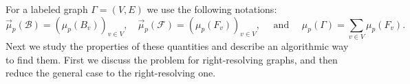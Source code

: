 \documentclass[12pt]{article}
\newcommand{\xmo}{X^{-\omega}}
\newcommand{\xo}{X^\omega}
\newcommand{\gr}{\Gamma}
\newcommand{\B}{\mathscr{B}}
\newcommand{\F}{\mathscr{F}}
\theoremstyle{definition}
\begin{document}
%
%

For a labeled graph $\gr=(V,E)$ we use the following notations:
\[
\vec\mu_p(\B)=(\mu_p(B_v))_{v\in V}, \quad  \vec\mu_p(\F)=(\mu_p(F_v))_{v\in V}, \quad \mbox{ and }
\quad \mu_p(\gr)=\sum_{v\in V} \mu_p(F_v).
\]
Next we study the properties of these quantities and describe an algorithmic way to find them.
First we discuss the problem for right-resolving graphs, and then reduce the general case to the
right-resolving one.
\end{document}
